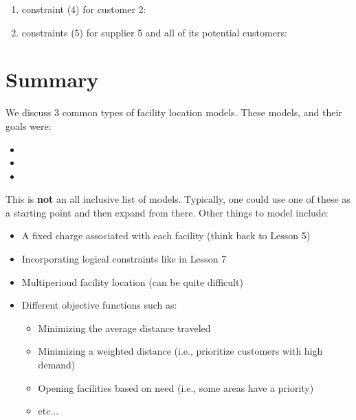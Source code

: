 \documentclass[11pt]{article}
\theoremstyle{definition}
\begin{document}
\begin{enumerate}[(a)]
\begin{enumerate}[i]
\vspace{2.2cm}


\item constraint (4) for customer 2:

\vspace{1cm}

\item constraints (5) for supplier 5 and all of its potential customers:

\vspace{1.9cm}
\end{enumerate}
\end{enumerate}

\newpage


\section{Summary}
We discuss 3 common types of facility location models. These models, and their goals were:
\begin{itemize}
\item \phantom{hi} 
\item \phantom{hi} \vspace{1in}
\item \phantom{hi} \vspace{1in}
\end{itemize}
\vspace{1in}

This is \textbf{not} an all inclusive list of models. Typically, one could use one of these as a starting point and then expand from there. Other things to model include:
	\begin{itemize}
	\item A fixed charge associated with each facility (think back to Lesson 5)
	\item Incorporating logical constraints like in Lesson 7
	\item Multiperioud facility location (can be quite difficult)
	\item Different objective functions such as:
		\begin{itemize}
		\item Minimizing the average distance traveled
		\item Minimizing a weighted distance (i.e., prioritize customers with high demand)
		\item Opening facilities based on need (i.e., some areas have a priority)
		\item etc...
		\end{itemize}
	\end{itemize}
\end{document}
